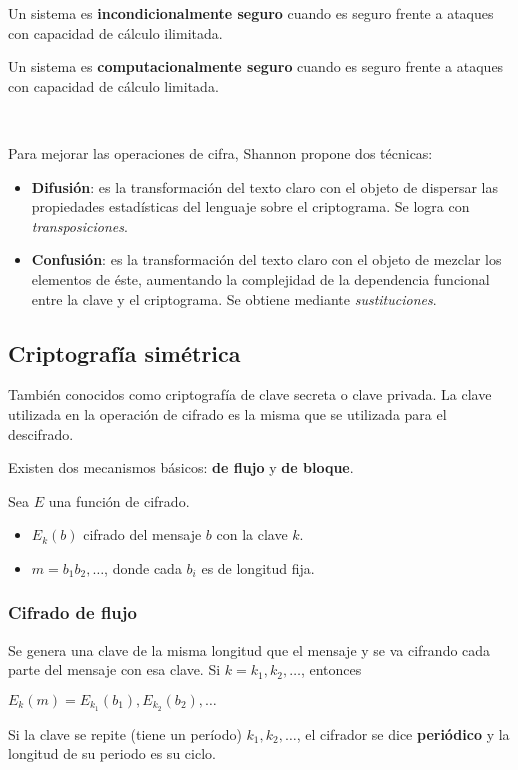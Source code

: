 Un sistema es \textbf{incondicionalmente seguro} cuando es seguro frente a ataques con capacidad de cálculo ilimitada.

Un sistema es \textbf{computacionalmente seguro} cuando es seguro frente a ataques con capacidad de cálculo limitada.

~\newline

Para mejorar las operaciones de cifra, Shannon propone dos técnicas: 
\begin{itemize}
	\item \textbf{Difusión}: es la transformación del texto claro con el objeto de dispersar las propiedades estadísticas del lenguaje sobre el criptograma. Se logra con \emph{transposiciones}.
	\item \textbf{Confusión}: es la transformación del texto claro con el objeto de mezclar los elementos de éste, aumentando la complejidad de la dependencia funcional entre la clave y el criptograma. Se obtiene mediante \emph{sustituciones}.
\end{itemize}

\subsection{Criptografía simétrica}
También conocidos como criptografía de clave secreta o clave privada. La clave utilizada en la operación de cifrado es la misma que se utilizada para el descifrado.

Existen dos mecanismos básicos: \textbf{de flujo} y \textbf{de bloque}.

Sea $E$ una función de cifrado.
\begin{itemize}
	\item $E_k(b)$ cifrado del mensaje $b$ con la clave $k$.
	\item $m = b_1b_2,\hdots$, donde cada $b_i$ es de longitud fija.
\end{itemize}


\subsubsection{Cifrado de flujo}
Se genera una clave de la misma longitud que el mensaje y se va cifrando cada parte del mensaje con esa clave. Si $k=k_1,k_2,\hdots$, entonces
\begin{center}
	$E_k(m) = E_{k_1}(b_1),E_{k_2}(b_2),\hdots$
\end{center}

Si la clave se repite (tiene un período) $k_1,k_2,\hdots$, el cifrador se dice \textbf{periódico} y la longitud de su periodo es su ciclo.

